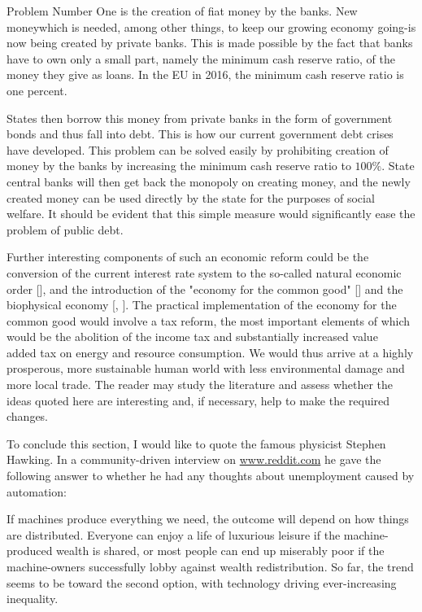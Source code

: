 \documentclass[10pt]{article}
\begin{document}
Problem Number One is the creation of fiat money by the banks. New moneywhich is needed, among other things, to keep our growing economy going-is now being created by private banks. This is made possible by the fact that banks have to own only a small part, namely the minimum cash reserve ratio, of the money they give as loans. In the EU in 2016, the minimum cash reserve ratio is one percent.

States then borrow this money from private banks in the form of government bonds and thus fall into debt. This is how our current government debt crises have developed. This problem can be solved easily by prohibiting creation of money by the banks by increasing the minimum cash reserve ratio to $100 \%$. State central banks will then get back the monopoly on creating money, and the newly created money can be used directly by the state for the purposes of social welfare. It should be evident that this simple measure would significantly ease the problem of public debt.

Further interesting components of such an economic reform could be the conversion of the current interest rate system to the so-called natural economic order [\cite{gesell1958natural}], and the introduction of the "economy for the common good" [\cite{felber2014gemeinwohl}] and the biophysical economy [\cite{grahl2009loch}, \cite{kummel2011second}]. The practical implementation of the economy for the common good would involve a tax reform, the most important elements of which would be the abolition of the income tax and substantially increased value\\
added tax on energy and resource consumption. We would thus arrive at a highly prosperous, more sustainable human world with less environmental damage and more local trade. The reader may study the literature and assess whether the ideas quoted here are interesting and, if necessary, help to make the required changes.


To conclude this section, I would like to quote the famous physicist Stephen Hawking. In a community-driven interview on \href{http://www.reddit.com}{www.reddit.com} he gave the following answer to whether he had any thoughts about unemployment caused by automation:

\begin{displayquote}
If machines produce everything we need, the outcome will depend on how things are distributed. Everyone can enjoy a life of luxurious leisure if the machine-produced wealth is shared, or most people can end up miserably poor if the machine-owners successfully lobby against wealth redistribution. So far, the trend seems to be toward the second option, with technology driving ever-increasing inequality.
\end{displayquote}
\end{document}
